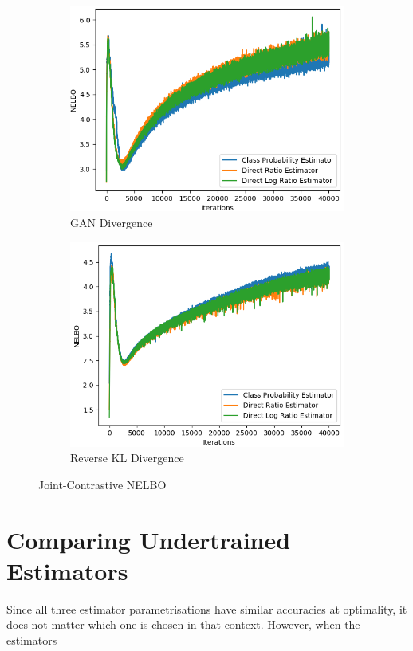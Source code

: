 \documentclass[honours,12pt]{unswthesis}
\numberwithin{equation}{section}
\theoremstyle{definition}
\begin{document}
\begin{figure}
\begin{subfigure}{0.49\textwidth}
\includegraphics[width=\linewidth]{nelbos/JCADVvsJCADVexpvsJCADVgudlog.png}
\caption{GAN Divergence}
\end{subfigure}
\begin{subfigure}{0.49\textwidth}
\includegraphics[width=\linewidth]{nelbos/JCKLDvsJCKLexpvsJCKLgudlog.png}
\caption{Reverse KL Divergence}
\end{subfigure}
\caption{Joint-Contrastive NELBO}
\end{figure}
\chapter{Comparing Undertrained Estimators}
Since all three estimator parametrisations have similar accuracies at optimality, it does not matter which one is chosen in that context. However, when the estimators 
\end{document}
